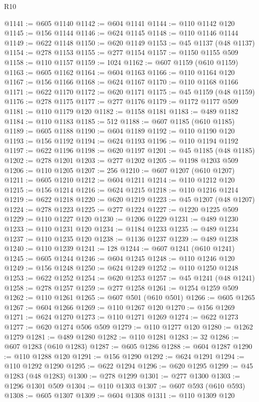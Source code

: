 \begin{lexlean}{R10}
\begin{coremodule}
@1141 := @605 @1140
@1142 := @604 @1141
@1144 := @110 @1142 @120
@1145 := @156 @1144
@1146 := @624 @1145
@1148 := @110 @1146 @1144
@1149 := @622 @1148
@1150 := @620 @1149
@1153 := @45 @1137 (@48 @1137)
@1154 := @278 @1153
@1155 := @277 @1154
@1157 := @1150 @1155 @509
@1158 := @110 @1157
@1159 := 1024
@1162 := @607 @1159 (@610 @1159)
@1163 := @605 @1162
@1164 := @604 @1163
@1166 := @110 @1164 @120
@1167 := @156 @1166
@1168 := @624 @1167
@1170 := @110 @1168 @1166
@1171 := @622 @1170
@1172 := @620 @1171
@1175 := @45 @1159 (@48 @1159)
@1176 := @278 @1175
@1177 := @277 @1176
@1179 := @1172 @1177 @509
@1181 := @110 @1179 @120
@1182 := @1158 @1181
@1183 := @489 @1182
@1184 := @110 @1183
@1185 := 512
@1188 := @607 @1185 (@610 @1185)
@1189 := @605 @1188
@1190 := @604 @1189
@1192 := @110 @1190 @120
@1193 := @156 @1192
@1194 := @624 @1193
@1196 := @110 @1194 @1192
@1197 := @622 @1196
@1198 := @620 @1197
@1201 := @45 @1185 (@48 @1185)
@1202 := @278 @1201
@1203 := @277 @1202
@1205 := @1198 @1203 @509
@1206 := @110 @1205
@1207 := 256
@1210 := @607 @1207 (@610 @1207)
@1211 := @605 @1210
@1212 := @604 @1211
@1214 := @110 @1212 @120
@1215 := @156 @1214
@1216 := @624 @1215
@1218 := @110 @1216 @1214
@1219 := @622 @1218
@1220 := @620 @1219
@1223 := @45 @1207 (@48 @1207)
@1224 := @278 @1223
@1225 := @277 @1224
@1227 := @1220 @1225 @509
@1229 := @110 @1227 @120
@1230 := @1206 @1229
@1231 := @489 @1230
@1233 := @110 @1231 @120
@1234 := @1184 @1233
@1235 := @489 @1234
@1237 := @110 @1235 @120
@1238 := @1136 @1237
@1239 := @489 @1238
@1240 := @110 @1239
@1241 := 128
@1244 := @607 @1241 (@610 @1241)
@1245 := @605 @1244
@1246 := @604 @1245
@1248 := @110 @1246 @120
@1249 := @156 @1248
@1250 := @624 @1249
@1252 := @110 @1250 @1248
@1253 := @622 @1252
@1254 := @620 @1253
@1257 := @45 @1241 (@48 @1241)
@1258 := @278 @1257
@1259 := @277 @1258
@1261 := @1254 @1259 @509
@1262 := @110 @1261
@1265 := @607 @501 (@610 @501)
@1266 := @605 @1265
@1267 := @604 @1266
@1269 := @110 @1267 @120
@1270 := @156 @1269
@1271 := @624 @1270
@1273 := @110 @1271 @1269
@1274 := @622 @1273
@1277 := @620 @1274 @506 @509
@1279 := @110 @1277 @120
@1280 := @1262 @1279
@1281 := @489 @1280
@1282 := @110 @1281
@1283 := 32
@1286 := @607 @1283 (@610 @1283)
@1287 := @605 @1286
@1288 := @604 @1287
@1290 := @110 @1288 @120
@1291 := @156 @1290
@1292 := @624 @1291
@1294 := @110 @1292 @1290
@1295 := @622 @1294
@1296 := @620 @1295
@1299 := @45 @1283 (@48 @1283)
@1300 := @278 @1299
@1301 := @277 @1300
@1303 := @1296 @1301 @509
@1304 := @110 @1303
@1307 := @607 @593 (@610 @593)
@1308 := @605 @1307
@1309 := @604 @1308
@1311 := @110 @1309 @120

\end{coremodule}
\end{lexlean}

